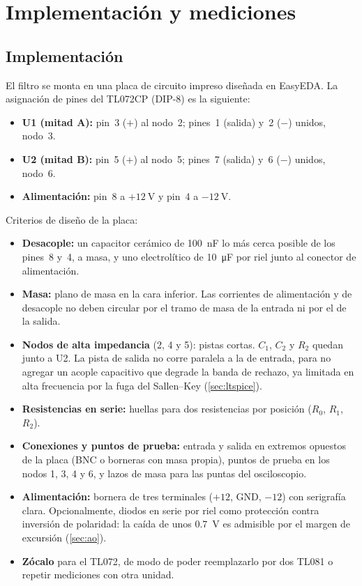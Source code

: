 \section{Implementación y mediciones}
\label{sec:mediciones}

\subsection{Implementación}
El filtro se monta en una placa de circuito impreso diseñada en EasyEDA. La asignación de pines del TL072CP (DIP-8) es la siguiente:
\begin{itemize}
  \item \textbf{U1 (mitad A):} pin~3 ($+$) al nodo~2; pines~1 (salida) y~2 ($-$) unidos, nodo~3.
  \item \textbf{U2 (mitad B):} pin~5 ($+$) al nodo~5; pines~7 (salida) y~6 ($-$) unidos, nodo~6.
  \item \textbf{Alimentación:} pin~8 a $+\qty{12}{\volt}$ y pin~4 a $-\qty{12}{\volt}$.
\end{itemize}
Criterios de diseño de la placa:
\begin{itemize}
  \item \textbf{Desacople:} un capacitor cerámico de \qty{100}{\nano\farad} lo más cerca posible de los pines~8 y~4, a masa, y uno electrolítico de
        \qty{10}{\micro\farad} por riel junto al conector de alimentación.
  \item \textbf{Masa:} plano de masa en la cara inferior. Las corrientes de alimentación y de desacople no deben circular por el tramo de masa de la
        entrada ni por el de la salida.
  \item \textbf{Nodos de alta impedancia} (2, 4 y 5): pistas cortas. $C_1$, $C_2$ y $R_2$ quedan junto a U2. La pista de salida no corre paralela a la
        de entrada, para no agregar un acople capacitivo que degrade la banda de rechazo, ya limitada en alta frecuencia por la fuga del Sallen--Key
        (\cref{sec:ltspice}).
  \item \textbf{Resistencias en serie:} huellas para dos resistencias por posición ($R_0$, $R_1$, $R_2$).
  \item \textbf{Conexiones y puntos de prueba:} entrada y salida en extremos opuestos de la placa (BNC o borneras con masa propia), puntos de prueba en
        los nodos 1, 3, 4 y 6, y lazos de masa para las puntas del osciloscopio.
  \item \textbf{Alimentación:} bornera de tres terminales ($+12$, GND, $-12$) con serigrafía clara. Opcionalmente, diodos en serie por riel como
        protección contra inversión de polaridad: la caída de unos \qty{0.7}{\volt} es admisible por el margen de excursión
        (\cref{sec:ao}).
  \item \textbf{Zócalo} para el TL072, de modo de poder reemplazarlo por dos TL081 o repetir mediciones con otra unidad.
\end{itemize}

